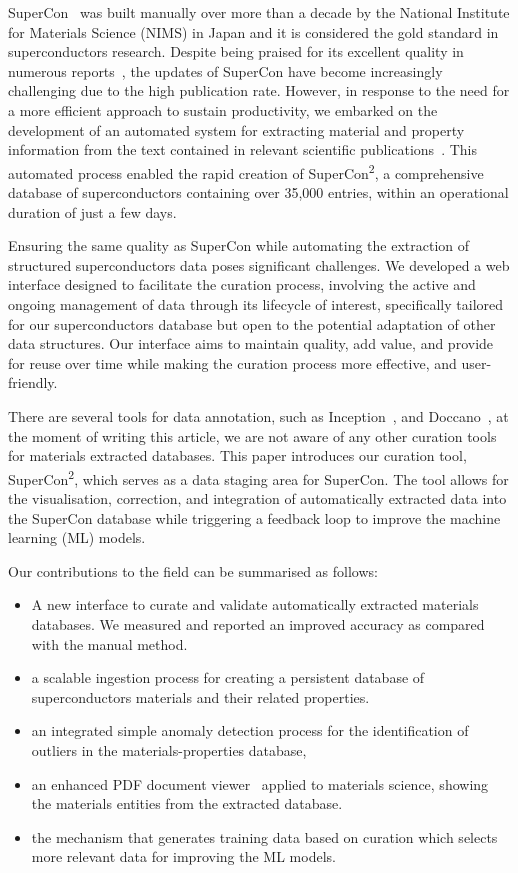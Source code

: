 \documentclass[a4paper]{article}
\begin{document}
SuperCon~\cite{SuperCon} was built manually over more than a decade by the National Institute for Materials Science (NIMS) in Japan and it is considered the gold standard in superconductors research.
Despite being praised for its excellent quality in numerous reports~\cite{roter2020predicting, stanev_machine_2017, tran2022machine, konno2021deep}, the updates of SuperCon have become increasingly challenging due to the high publication rate. However, in response to the need for a more efficient approach to sustain productivity, we embarked on the development of an automated system for extracting material and property information from the text contained in relevant scientific publications~\cite{lfoppiano2023automatic}. This automated process enabled the rapid creation of SuperCon\textsuperscript{2}, a comprehensive database of superconductors containing over 35,000 entries, within an operational duration of just a few days. 

Ensuring the same quality as SuperCon while automating the extraction of structured superconductors data poses significant challenges. 
We developed a web interface designed to facilitate the curation process, involving the active and ongoing management of data through its lifecycle of interest, specifically tailored for our superconductors database but open to the potential adaptation of other data structures. 
Our interface aims to maintain quality, add value, and provide for reuse over time while making the curation process more effective, and user-friendly.

There are several tools for data annotation, such as Inception~\cite{klie-etal-2018-inception}, and Doccano~\cite{doccano}, at the moment of writing this article, we are not aware of any other curation tools for materials extracted databases. 
This paper introduces our curation tool, SuperCon\textsuperscript{2}, which serves as a data staging area for SuperCon. 
The tool allows for the visualisation, correction, and integration of automatically extracted data into the SuperCon database while triggering a feedback loop to improve the machine learning (ML) models.

Our contributions to the field can be summarised as follows:
\begin{itemize}
    \item A new interface to curate and validate automatically extracted materials databases. We measured and reported an improved accuracy as compared with the manual method.
    \item a scalable ingestion process for creating a persistent database of superconductors materials and their related properties.
    \item an integrated simple anomaly detection process for the identification of outliers in the materials-properties database, 
    \item an enhanced PDF document viewer~\cite{wang2022hammer} applied to materials science, showing the materials entities from the extracted database. 
    \item the mechanism that generates training data based on curation which selects more relevant data for improving the ML models.
\end{itemize}
\end{document}
